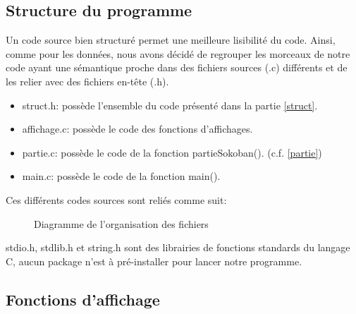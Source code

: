 \documentclass[10pt,a4paper,french,titlepage]{article}
\begin{document}
\subsection{Structure du programme}
Un code source bien structuré permet une meilleure lisibilité du code. Ainsi, comme pour les données, nous avons décidé de regrouper les morceaux de notre code ayant une sémantique proche dans des fichiers sources (.c) différents et de les relier avec des fichiers en-tête (.h).
\begin{itemize}
\item struct.h: possède l'ensemble du code présenté dans la partie \ref{struct}.
\item affichage.c: possède le code des fonctions d'affichages.
\item partie.c: possède le code de la fonction partieSokoban(). (c.f. \ref{partie})
\item main.c: possède le code de la fonction main().
\end{itemize}
Ces différents codes sources sont reliés comme suit:
\begin{figure}[h]
\centering
{}
\caption{Diagramme de l'organisation des fichiers}
\end{figure}

stdio.h, stdlib.h et string.h sont des librairies de fonctions standards du langage C, aucun package n'est à pré-installer pour lancer notre programme.
\newpage
\subsection{Fonctions d'affichage}
\end{document}
